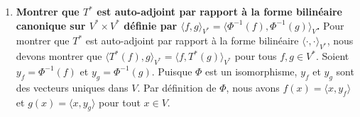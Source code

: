 \documentclass[11pt,a4paper]{report}
\begin{document}
\begin{enumerate}
\begin{enumerate}
    Nous savons également que \(\langle x, u_i \rangle = f_i(x)\)
    d'après la question 4.a.
    \[ (T^*(f_j))(x) = \sum_{i=1}^k G_{ij} f_i(x) \] Puisque cette
    égalité est vraie pour tout \(x \in V\), les formes linéaires sont
    égales : \[ T^*(f_j) = \sum_{i=1}^k G_{ij} f_i \] Ceci exprime
    \(T^*(f_j)\) comme une combinaison linéaire des formes linéaires
    \(f_i\), où les coefficients sont les éléments de la \(j\)-ième
    colonne de la matrice de Gram \(G\).
  \item
    \textbf{Montrer que \(T^*\) est auto-adjoint par rapport à la forme
    bilinéaire canonique sur \(V^* \times V^*\) définie par
    \(\langle f, g \rangle_{V^*} = \langle \Phi^{-1}(f), \Phi^{-1}(g) \rangle_V\).}
    Pour montrer que \(T^*\) est auto-adjoint par rapport à la forme
    bilinéaire \(\langle \cdot, \cdot \rangle_{V^*}\), nous devons
    montrer que
    \(\langle T^*(f), g \rangle_{V^*} = \langle f, T^*(g) \rangle_{V^*}\)
    pour tous \(f, g \in V^*\). Soient \(y_f = \Phi^{-1}(f)\) et
    \(y_g = \Phi^{-1}(g)\). Puisque \(\Phi\) est un isomorphisme,
    \(y_f\) et \(y_g\) sont des vecteurs uniques dans \(V\). Par
    définition de \(\Phi\), nous avons \(f(x) = \langle x, y_f \rangle\)
    et \(g(x) = \langle x, y_g \rangle\) pour tout \(x \in V\).


\end{enumerate}
\end{enumerate}
\end{document}
